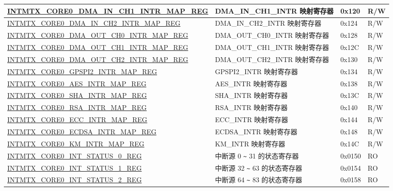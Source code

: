 \begin{longtable}{ | p{10cm} | p{10cm} | p{1.3cm} | p{1cm} | }
\hyperref[regdesc:INTMTXCORE0DMAINCH1INTRMAPREG]{INTMTX\_CORE0\_DMA\_IN\_CH1\_INTR\_MAP\_REG} & DMA\_IN\_CH1\_INTR 映射寄存器 & 0x120 & R/W  \\ \hline
\hyperref[regdesc:INTMTXCORE0DMAINCH2INTRMAPREG]{INTMTX\_CORE0\_DMA\_IN\_CH2\_INTR\_MAP\_REG} & DMA\_IN\_CH2\_INTR 映射寄存器 & 0x124 & R/W  \\ \hline
\hyperref[regdesc:INTMTXCORE0DMAOUTCH0INTRMAPREG]{INTMTX\_CORE0\_DMA\_OUT\_CH0\_INTR\_MAP\_REG} & DMA\_OUT\_CH0\_INTR 映射寄存器 & 0x128 & R/W  \\ \hline
\hyperref[regdesc:INTMTXCORE0DMAOUTCH1INTRMAPREG]{INTMTX\_CORE0\_DMA\_OUT\_CH1\_INTR\_MAP\_REG} & DMA\_OUT\_CH1\_INTR 映射寄存器 & 0x12C & R/W  \\ \hline
\hyperref[regdesc:INTMTXCORE0DMAOUTCH2INTRMAPREG]{INTMTX\_CORE0\_DMA\_OUT\_CH2\_INTR\_MAP\_REG} & DMA\_OUT\_CH2\_INTR 映射寄存器 & 0x130 & R/W  \\ \hline
\hyperref[regdesc:INTMTXCORE0GPSPI2INTRMAPREG]{INTMTX\_CORE0\_GPSPI2\_INTR\_MAP\_REG} & GPSPI2\_INTR 映射寄存器 & 0x134 & R/W  \\ \hline
\hyperref[regdesc:INTMTXCORE0AESINTRMAPREG]{INTMTX\_CORE0\_AES\_INTR\_MAP\_REG} & AES\_INTR 映射寄存器 & 0x138 & R/W  \\ \hline
\hyperref[regdesc:INTMTXCORE0SHAINTRMAPREG]{INTMTX\_CORE0\_SHA\_INTR\_MAP\_REG} & SHA\_INTR 映射寄存器 & 0x13C & R/W  \\ \hline
\hyperref[regdesc:INTMTXCORE0RSAINTRMAPREG]{INTMTX\_CORE0\_RSA\_INTR\_MAP\_REG} & RSA\_INTR 映射寄存器 & 0x140 & R/W  \\ \hline
\hyperref[regdesc:INTMTXCORE0ECCINTRMAPREG]{INTMTX\_CORE0\_ECC\_INTR\_MAP\_REG} & ECC\_INTR 映射寄存器 & 0x144 & R/W  \\ \hline
\hyperref[regdesc:INTMTXCORE0ECDSAINTRMAPREG]{INTMTX\_CORE0\_ECDSA\_INTR\_MAP\_REG} & ECDSA\_INTR 映射寄存器 & 0x148 & R/W  \\ \hline
\hyperref[regdesc:INTMTXCORE0KMINTRMAPREG]{INTMTX\_CORE0\_KM\_INTR\_MAP\_REG} & KM\_INTR 映射寄存器 & 0x14C & R/W  \\ \hline
\hyperref[regdesc:INTMTXCORE0INTSTATUS0REG]{INTMTX\_CORE0\_INT\_STATUS\_0\_REG} & 中断源 0 \verb+~+ 31 的状态寄存器 & 0x0150 & RO \\ \hline
\hyperref[regdesc:INTMTXCORE0INTSTATUS1REG]{INTMTX\_CORE0\_INT\_STATUS\_1\_REG} & 中断源 32 \verb+~+ 63 的状态寄存器 & 0x0154 & RO \\ \hline
\hyperref[regdesc:INTMTXCORE0INTSTATUS2REG]{INTMTX\_CORE0\_INT\_STATUS\_2\_REG} & 中断源 64 \verb+~+ 83 的状态寄存器 & 0x0158 & RO \\ \hline

\end{longtable}
